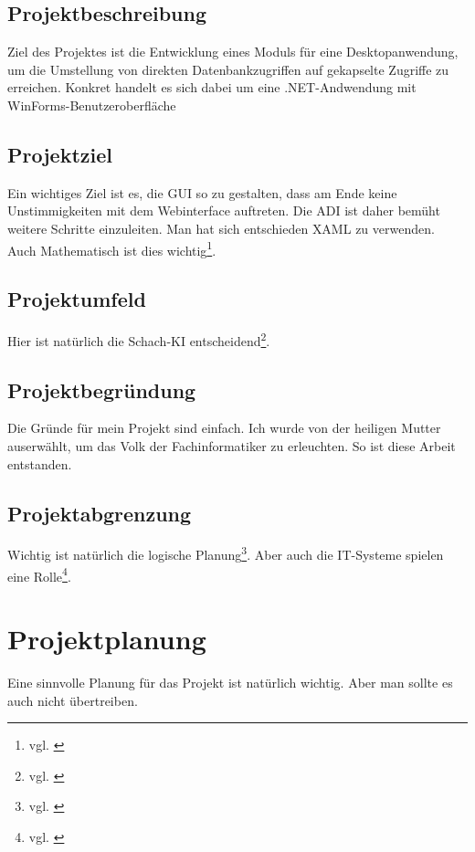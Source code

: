 \documentclass[11pt,toc=sectionentrywithoutdots, 
headheight=44pt, headings=optiontoheadandtoc, hyperfootnotes=false]{scrartcl}
\begin{document}
\subsection{Projektbeschreibung}
Ziel des Projektes ist die Entwicklung eines Moduls für eine Desktopanwendung, um die Umstellung von direkten Datenbankzugriffen auf gekapselte Zugriffe zu erreichen. Konkret handelt es sich dabei um eine .NET-Andwendung mit WinForms-Benutzeroberfläche

\subsection{Projektziel}
Ein wichtiges Ziel ist es, die \acs{GUI} so zu gestalten, dass am Ende keine Unstimmigkeiten mit dem 
Webinterface auftreten. Die \acs{ADI} ist daher bemüht weitere Schritte einzuleiten. Man hat sich entschieden \acs{XAML} zu verwenden. Auch Mathematisch ist dies wichtig\footnote{vgl. \cite{GeraldTeschl2008}}.

\subsection{Projektumfeld}
Hier ist natürlich die Schach-KI entscheidend\footnote{vgl. \cite{Schrepel2011}}.

\subsection{Projektbegründung}
Die Gründe für mein Projekt sind einfach. Ich wurde von der heiligen Mutter auserwählt,
um das Volk der Fachinformatiker zu erleuchten. So ist diese Arbeit entstanden.

\subsection{Projektabgrenzung}
Wichtig ist natürlich die logische Planung\footnote{vgl. \cite{Weigel2015}}. Aber auch die IT-Systeme spielen eine Rolle\footnote{vgl. \cite{Gettner2015}}.

\section{Projektplanung}
Eine sinnvolle Planung für das Projekt ist natürlich wichtig. Aber man sollte es auch nicht übertreiben.
\end{document}
